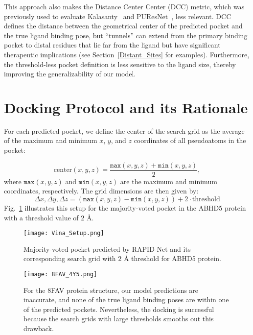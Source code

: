 \documentclass[10pt,conference]{IEEEtran}
\begin{document}
This approach also makes the Distance Center Center (DCC) metric, which was previously used to evaluate Kalasanty~\cite{stepniewska2020improving} and PUResNet~\cite{kandel2021puresnet}, less relevant. DCC defines the distance between the geometrical center of the predicted pocket and the true ligand binding pose, but ``tunnels'' can extend from the primary binding pocket to distal residues that lie far from the ligand but have significant therapeutic implications (see Section~\ref{Distant_Sites} for examples). Furthermore, the threshold-less pocket definition is less sensitive to the ligand size, thereby improving the generalizability of our model.








\section{Docking Protocol and its Rationale}
\label{Docking_protocol}
For each predicted pocket, we define the center of the search grid as the average of the maximum and minimum $x$, $y$, and $z$ coordinates of all pseudoatoms in the pocket:

\begin{equation}
\text{center}\left(x,y,z\right) = \frac{\texttt{max}\left(x,y,z\right) + \texttt{min}\left(x,y,z\right)}{2},
\end{equation}
where $\texttt{max}\left(x,y,z\right)$ and $\texttt{min}\left(x,y,z\right)$  are the maximum and minimum coordinates, respectively. The grid dimensions are then given by:
\begin{equation}
\Delta x,\Delta y,\Delta z = (\texttt{max}\left(x,y,z\right) - \texttt{min}\left(x,y,z\right)) + 2 \cdot \text{threshold}
\end{equation}
Fig.~\ref{Vina_Setup_Fig} illustrates this setup for the majority-voted pocket in the ABHD5 protein with a threshold value of $2$ $\text{\AA}$.

\begin{figure}[]{}
\texttt{[image: Vina\_Setup.png]}
  \caption{Majority-voted pocket predicted by RAPID-Net and its corresponding search grid with $2$ $\text{\AA}$ threshold for ABHD5 protein.}
\label{Vina_Setup_Fig}
\end{figure}

\begin{figure}[]{}
\texttt{[image: 8FAV\_4Y5.png]}
  \caption{For the 8FAV protein structure, our model predictions are inaccurate, and none of the true ligand binding poses are within one of the predicted pockets. Nevertheless, the docking is successful because the search grids with large thresholds smooths out this drawback.}
\label{8FAV_4Y5_Fig}
\end{figure}
\end{document}
